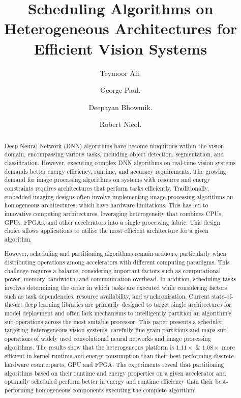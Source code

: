\documentclass[]{spie}  %
\title{Scheduling Algorithms on Heterogeneous Architectures for Efficient Vision Systems}
\author[]{Teymoor Ali. }
\author[a,b]{George Paul. }
\author[a]{Deepayan Bhowmik.}
\author[b]{Robert Nicol.}
\affil[a]{Newcastle University, 1 Science Square, Newcastle upon Tyne, U.K}
\affil[b]{STMicroelectronics, 1 Tanfield, Inverleith Row, Edinburgh, U.K}
\begin{document}
 
\maketitle

\begin{abstract}
Deep Neural Network (DNN) algorithms have become ubiquitous within the vision domain, encompassing various tasks, including object detection, segmentation, and classification. However, executing complex DNN algorithms on real-time vision systems demands better energy efficiency, runtime, and accuracy requirements. The growing demand for image processing algorithms on systems with resource and energy constraints requires architectures that perform tasks efficiently. Traditionally, embedded imaging designs often involve implementing image processing algorithms on homogeneous architectures, which have hardware limitations. This has led to innovative computing architectures, leveraging heterogeneity that combines CPUs, GPUs, FPGAs, and other accelerators into a single processing fabric. This design choice allows applications to utilise the most efficient architecture for a given algorithm.

However, scheduling and partitioning algorithms remain arduous, particularly when distributing operations among accelerators with different computing paradigms. This challenge requires a balance, considering important factors such as computational power, memory bandwidth, and communication overhead. In addition, scheduling tasks involves determining the order in which tasks are executed while considering factors such as task dependencies, resource availability, and synchronisation. Current state-of-the-art deep learning libraries are primarily designed to target single architectures for model deployment and often lack mechanisms to intelligently partition an algorithm's sub-operations across the most suitable processor. This paper presents a scheduler targeting heterogeneous vision systems, carefully fine-grain partitions and maps sub-operations of widely used convolutional neural networks and image processing algorithms. The results show that the heterogeneous platform is \textbf{$\mathbf{1.11\times}$} \& \textbf{$\mathbf{1.08\times}$} more efficient in kernel runtime and energy consumption than their best performing discrete hardware counterparts, GPU and FPGA. The experiments reveal that partitioning algorithms based on their runtime and energy properties on a given accelerator and optimally scheduled perform better in energy and runtime efficiency than their best-performing homogeneous components executing the complete algorithm.
\end{abstract}
\end{document}
